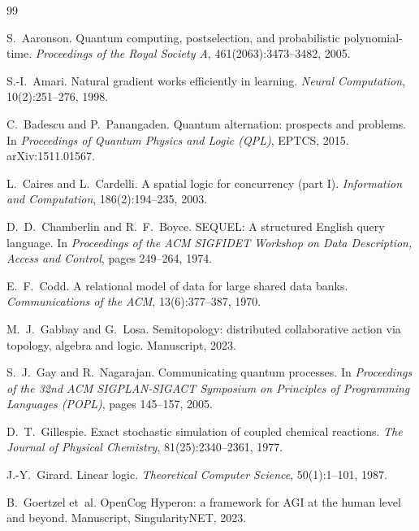 \documentclass[11pt]{article}
\theoremstyle{definition}
\theoremstyle{plain}
\theoremstyle{remark}
\begin{document}
\tableofcontents








\begin{thebibliography}{99}\small

S.~Aaronson.
\newblock Quantum computing, postselection, and probabilistic polynomial-time.
\newblock \emph{Proceedings of the Royal Society A}, 461(2063):3473--3482, 2005.

S.-I.~Amari.
\newblock Natural gradient works efficiently in learning.
\newblock \emph{Neural Computation}, 10(2):251--276, 1998.

C.~Badescu and P.~Panangaden.
\newblock Quantum alternation: prospects and problems.
\newblock In \emph{Proceedings of Quantum Physics and Logic (QPL)}, EPTCS, 2015.
\newblock arXiv:1511.01567.

L.~Caires and L.~Cardelli.
\newblock A spatial logic for concurrency (part I).
\newblock \emph{Information and Computation}, 186(2):194--235, 2003.

D.~D.~Chamberlin and R.~F.~Boyce.
\newblock SEQUEL: A structured English query language.
\newblock In \emph{Proceedings of the ACM SIGFIDET Workshop on Data Description,
Access and Control}, pages 249--264, 1974.

E.~F.~Codd.
\newblock A relational model of data for large shared data banks.
\newblock \emph{Communications of the ACM}, 13(6):377--387, 1970.

M.~J.~Gabbay and G.~Losa.
\newblock Semitopology: distributed collaborative action via topology, algebra
and logic.
\newblock Manuscript, 2023.

S.~J.~Gay and R.~Nagarajan.
\newblock Communicating quantum processes.
\newblock In \emph{Proceedings of the 32nd ACM SIGPLAN-SIGACT Symposium on
Principles of Programming Languages (POPL)}, pages 145--157, 2005.

D.~T.~Gillespie.
\newblock Exact stochastic simulation of coupled chemical reactions.
\newblock \emph{The Journal of Physical Chemistry}, 81(25):2340--2361, 1977.

J.-Y.~Girard.
\newblock Linear logic.
\newblock \emph{Theoretical Computer Science}, 50(1):1--101, 1987.

B.~Goertzel et~al.
\newblock OpenCog Hyperon: a framework for AGI at the human level and beyond.
\newblock Manuscript, SingularityNET, 2023.


\end{thebibliography}
\end{document}
